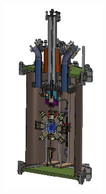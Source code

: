\begin{figure}[h]
\begin{figure}[h]
\centering
\begin{subfigure}[c]{0.45\textwidth}
\includegraphics[width=0.75\textwidth , height=0.3\textheight]{detCAD.png}%
\end{subfigure}	
\begin{subfigure}[c]{0.45\textwidth}

\end{subfigure}
\end{figure}
\end{figure}
